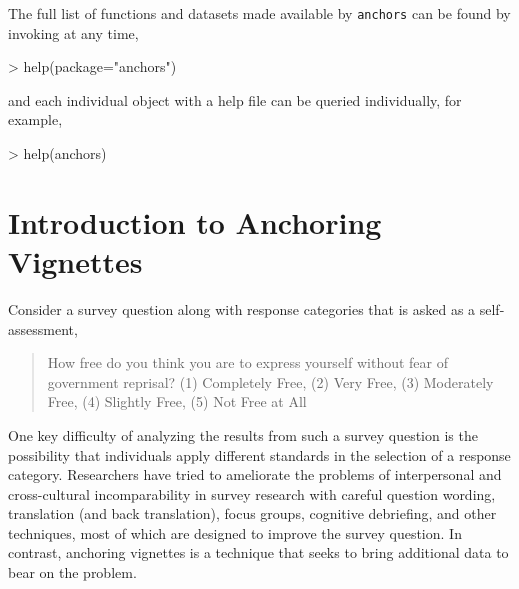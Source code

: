 \documentclass{amsart}
\newcommand{\Ranchors}{{\texttt{anchors}}}
\begin{document}
The full list of functions and datasets made available by \Ranchors
can be found by invoking at any time,
\begin{Schunk}
\begin{Sinput}
> help(package="anchors")
\end{Sinput}
\end{Schunk}
and each individual object with a help file can be queried
individually, for example,
\begin{Schunk}
\begin{Sinput}
> help(anchors)
\end{Sinput}
\end{Schunk}

\section{Introduction to Anchoring Vignettes}

Consider a survey question along with response categories that is
asked as a self-assessment,
\begin{quote}
 How free do you think you are to express  yourself without fear
of government reprisal?   (1) Completely
  Free, (2) Very Free, (3) Moderately Free, (4) Slightly Free, (5) Not
  Free at All
\end{quote}
One key difficulty of analyzing the results from such a survey
question is the possibility that individuals apply different standards
in the selection of a response category.  Researchers have tried to
ameliorate the problems of interpersonal and cross-cultural
incomparability in survey research with careful question wording,
translation (and back translation), focus groups, cognitive
debriefing, and other techniques, most of which are designed to
improve the survey question. In contrast, anchoring vignettes is a
technique that seeks to bring additional data to bear on the
problem. 
\end{document}
